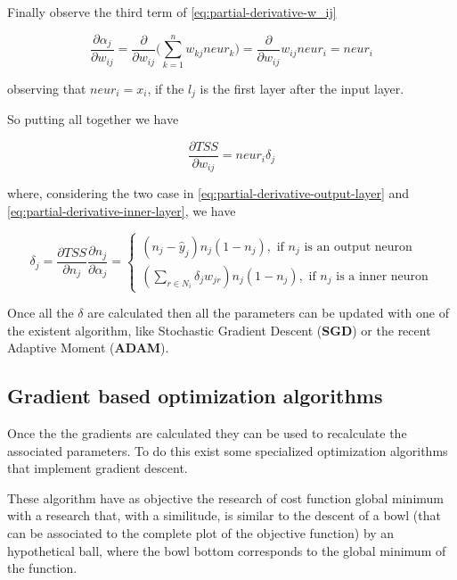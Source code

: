 Finally observe the third term of \ref{eq:partial-derivative-w_ij}
\begin{center}
	\begin{equation}
		\frac{\partial{\alpha_j}}{\partial{w_{ij}}} = \frac{\partial{}}{\partial{w_{ij}}}\Bigg(\sum\limits_{k=1}^n w_{kj}neur_k\Bigg) = \frac{\partial{}}{\partial{w_{ij}}}w_{ij}neur_i = neur_i
	\end{equation}
\end{center}
observing that $neur_i = x_i$, if the $l_j$ is the first layer after the input layer.

So putting all together we have 
\begin{center}
	\begin{equation}
		\frac{\partial{TSS}}{\partial{w_{ij}}} = neur_i\delta_j
	\end{equation}
\end{center}
where, considering the two case in \ref{eq:partial-derivative-output-layer} and \ref{eq:partial-derivative-inner-layer}, we have
\begin{center}
	\begin{equation}
		\delta_j = \frac{\partial{TSS}}{\partial{n_j}}\frac{\partial{n_j}}{\partial{\alpha_j}} = \left.
		\begin{cases}
			(n_j - \hat{y}_j)n_j(1 - n_j),\textrm{ if } n_j \textrm{ is an output neuron} \\
(\sum\limits_{r	\in N_i}\delta_{j}w_{jr})n_{j}(1 - n_{j}), \textrm{ if }n_j\textrm{ is a inner neuron}
		\end{cases}\right.
	\end{equation}
\end{center} 

Once all the $\delta$ are calculated then all the parameters can be updated with one of the existent algorithm, like Stochastic Gradient Descent (\textbf{SGD}) or the recent Adaptive Moment (\textbf{ADAM}).


\subsection{Gradient based optimization algorithms}
Once the the gradients are calculated they can be used to recalculate the associated parameters. To do this exist some specialized optimization algorithms that implement gradient descent.

These algorithm have as objective the research of cost function global minimum with a research that, with a similitude, is similar to the descent of a bowl (that can be associated to the complete plot of the objective function) by an hypothetical ball, where the bowl bottom corresponds to the global minimum of the function.


